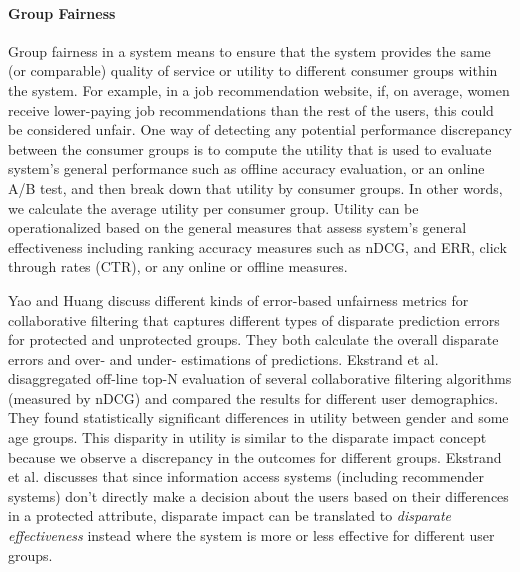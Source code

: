             \vspace{0.25cm}
            \noindent \paragraph{Group Fairness}
            \vspace{0.25cm}
            
                Group fairness in a system means to ensure that the system provides the same (or comparable) quality of service or utility to different consumer groups within the system. For example, in a job recommendation website, if, on average, women receive lower-paying job recommendations than the rest of the users, this could be considered unfair. One way of detecting any potential performance discrepancy between the consumer groups is to compute the utility that is used to evaluate system's general performance such as offline accuracy evaluation, or an online A/B test, and then break down that utility by consumer groups. In other words, we calculate the average utility per consumer group. Utility can be operationalized based on the general measures that assess system's general effectiveness including ranking accuracy measures such as nDCG, and ERR, click through rates (CTR), or any online or offline measures.
            
                Yao and Huang \cite{yao_huang_fatml-2017} discuss different kinds of error-based unfairness metrics for collaborative filtering that captures different types of disparate prediction errors for protected and unprotected groups. They both calculate the overall disparate errors and over- and under- estimations of predictions. Ekstrand et al. \cite{ekstrand2018all} disaggregated off-line top-N evaluation of several collaborative filtering algorithms (measured by nDCG) and compared the results for different user demographics. They found statistically significant differences in utility between gender and some age groups. This disparity in utility is similar to the disparate impact concept because we observe a discrepancy in the outcomes for different groups. Ekstrand et al. \cite{ekstrand2021fairness} discusses that since information access systems (including recommender systems) don't directly make a decision about the users based on their differences in a protected attribute, disparate impact can be translated to \textit{disparate effectiveness} instead where the system is more or less effective for different user groups. 
            
